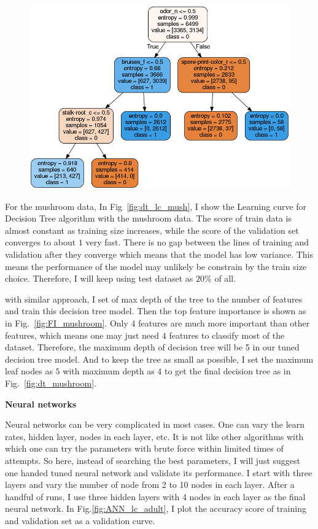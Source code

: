 \documentclass[         %
aps,                    %
prl,                    %
showpacs,               %
superscriptaddress,    %
nofootinbib,            %
twocolumn,             %
showkeys,               %
preprintnumbers,        %
floatfix               %
]{revtex4-1}               %
\begin{document}
\begin{figure}[h!]
  \centering \includegraphics[width=\linewidth]{../dt_mushroom.png}
  \caption{\label{fig:dt_mush}}
\end{figure}

For the mushroom data, In Fig~\ref{fig:dt_lc_mush}, I show the Learning curve for Decision Tree algorithm with the mushroom data. 
The score of train data is almost constant as training size increases, while the score of the validation set converges to about $1$ very fast.
There is no gap between the lines of training and validation after they converge which means that the model has low variance.
This means the performance of the model may unlikely be constrain by the train size choice. Therefore, I will keep using test dataset as $20\%$ of all. 

with similar approach, I set of max depth of the tree to the number of features and train this decision tree model. Then the top feature importance is shown as in Fig.~\ref{fig:FI_mushroom}. 
Only $4$ features are much more important than other features, which means one may just need $4$ features to classify most of the dataset.
Therefore, the maximum depth of decision tree will be 5 in our tuned decision tree model. 
And to keep the tree as small as possible, I set the maximum leaf nodes as $5$ with maximum depth as $4$ to get the final decision tree as in Fig.~\ref{fig:dt_mushroom}.

{\bf Neural networks}\label{nn}

Neural networks can be very complicated in most cases. 
One can vary the learn rates, hidden layer, nodes in each layer, etc.
It is not like other algorithms with which one can try the parameters with brute force within limited times of attempts. 
So here, instead of searching the best parameters, I will just suggest one handed tuned neural network and validate its performance.
I start with three layers and vary the number of node from 2 to 10 nodes in each layer. 
After a handful of runs, I use three hidden layers with 4 nodes in each layer as the final neural network. 
In Fig.\ref{fig:ANN_lc_adult}, I plot the accuracy score of training and validation set as a validation curve.
\end{document}
